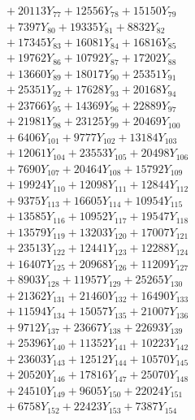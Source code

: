 \documentclass[a4paper,10pt]{article}
\begin{document}
{\begin{align}
&\;  + 20113 Y_{77} + 12556 Y_{78} + 15150 Y_{79} \\[0.3ex]
&\;  + 7397 Y_{80} + 19335 Y_{81} + 8832 Y_{82} \\[0.3ex]
&\;  + 17345 Y_{83} + 16081 Y_{84} + 16816 Y_{85} \\[0.3ex]
&\;  + 19762 Y_{86} + 10792 Y_{87} + 17202 Y_{88} \\[0.5ex]\allowbreak
&\;  + 13660 Y_{89} + 18017 Y_{90} + 25351 Y_{91} \\[0.3ex]
&\;  + 25351 Y_{92} + 17628 Y_{93} + 20168 Y_{94} \\[0.3ex]
&\;  + 23766 Y_{95} + 14369 Y_{96} + 22889 Y_{97} \\[0.3ex]
&\;  + 21981 Y_{98} + 23125 Y_{99} + 20469 Y_{100} \\[0.3ex]
&\;  + 6406 Y_{101} + 9777 Y_{102} + 13184 Y_{103} \\[0.3ex]
&\;  + 12061 Y_{104} + 23553 Y_{105} + 20498 Y_{106} \\[0.3ex]
&\;  + 7690 Y_{107} + 20464 Y_{108} + 15792 Y_{109} \\[0.3ex]
&\;  + 19924 Y_{110} + 12098 Y_{111} + 12844 Y_{112} \\[0.3ex]
&\;  + 9375 Y_{113} + 16605 Y_{114} + 10954 Y_{115} \\[0.3ex]
&\;  + 13585 Y_{116} + 10952 Y_{117} + 19547 Y_{118} \\[0.5ex]\allowbreak
&\;  + 13579 Y_{119} + 13203 Y_{120} + 17007 Y_{121} \\[0.3ex]
&\;  + 23513 Y_{122} + 12441 Y_{123} + 12288 Y_{124} \\[0.3ex]
&\;  + 16407 Y_{125} + 20968 Y_{126} + 11209 Y_{127} \\[0.3ex]
&\;  + 8903 Y_{128} + 11957 Y_{129} + 25265 Y_{130} \\[0.3ex]
&\;  + 21362 Y_{131} + 21460 Y_{132} + 16490 Y_{133} \\[0.3ex]
&\;  + 11594 Y_{134} + 15057 Y_{135} + 21007 Y_{136} \\[0.3ex]
&\;  + 9712 Y_{137} + 23667 Y_{138} + 22693 Y_{139} \\[0.3ex]
&\;  + 25396 Y_{140} + 11352 Y_{141} + 10223 Y_{142} \\[0.3ex]
&\;  + 23603 Y_{143} + 12512 Y_{144} + 10570 Y_{145} \\[0.3ex]
&\;  + 20520 Y_{146} + 17816 Y_{147} + 25070 Y_{148} \\[0.5ex]\allowbreak
&\;  + 24510 Y_{149} + 9605 Y_{150} + 22024 Y_{151} \\[0.3ex]
&\;  + 6758 Y_{152} + 22423 Y_{153} + 7387 Y_{154} \\[0.3ex]

\end{align}}
\end{document}
